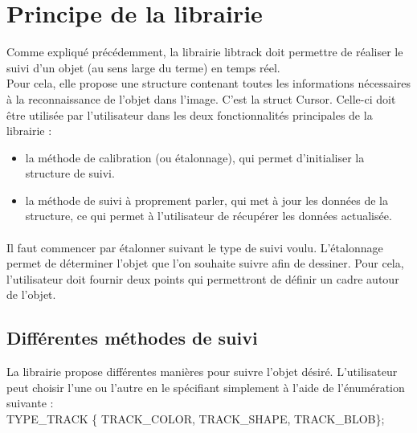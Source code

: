 \documentclass{article}
\begin{document}
\section{Principe de la librairie}
Comme expliqué précédemment, la librairie libtrack doit permettre de réaliser le suivi d'un objet (au sens large du terme) en temps réel.\\
Pour cela, elle propose une structure contenant toutes les informations nécessaires à la reconnaissance de l'objet dans l'image. C'est la struct Cursor.
Celle-ci doit être utilisée par l'utilisateur dans les deux fonctionnalités principales de la librairie : \begin{itemize}
\item la méthode de calibration (ou étalonnage), qui permet d'initialiser la structure de suivi.
\item la méthode de suivi à proprement parler, qui met à jour les données de la structure, ce qui permet à l'utilisateur de récupérer les données actualisée.
\end{itemize}

\paragraph{}
Il faut commencer par étalonner suivant le type de suivi voulu.
L'étalonnage permet de déterminer l'objet que l'on souhaite suivre afin de dessiner. Pour cela, l'utilisateur doit fournir deux points qui permettront de définir un cadre autour de l'objet.

\subsection{Différentes méthodes de suivi}
La librairie propose différentes manières pour suivre l'objet désiré. L'utilisateur peut choisir l'une ou l'autre en le spécifiant simplement à l'aide de l'énumération suivante :\\
TYPE\_TRACK \{ TRACK\_COLOR, TRACK\_SHAPE, TRACK\_BLOB\};
\end{document}
